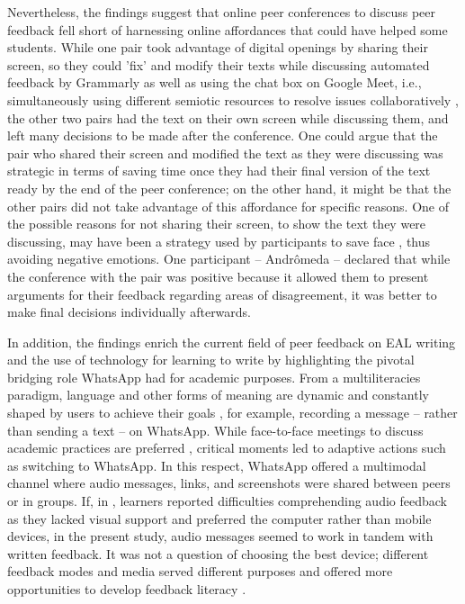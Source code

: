 \documentclass[english]{textolivre}
\begin{document}
Nevertheless, the findings suggest that online peer conferences to discuss peer feedback fell short of harnessing online affordances that could have helped some students. While one pair took advantage of digital openings by sharing their screen, so they could 'fix' and modify their texts while discussing automated feedback by Grammarly as well as using the chat box on Google Meet, i.e., simultaneously using different semiotic resources \cite{belda2021enhancing} to resolve issues collaboratively \cite{cheung2022verbal, cope2017learning}, the other two pairs had the text on their own screen while discussing them, and left many decisions to be made after the conference. One could argue that the pair who shared their screen and modified the text as they were discussing was strategic in terms of saving time once they had their final version of the text ready by the end of the peer conference; on the other hand, it might be that the other pairs did not take advantage of this affordance for specific reasons. One of the possible reasons for not sharing their screen, to show the text they were discussing, may have been a strategy used by participants to save face \cite{goffman1967interaction}, thus avoiding negative emotions. One participant – Andrômeda – declared that while the conference with the pair was positive because it allowed them to present arguments for their feedback regarding areas of disagreement, it was better to make final decisions individually afterwards.

In addition, the findings enrich the current field of peer feedback on EAL writing and the use of technology for learning to write by highlighting the pivotal bridging role WhatsApp had for academic purposes. From a multiliteracies paradigm, language and other forms of meaning are dynamic and constantly shaped by users to achieve their goals \cite{newlondon1996}, for example, recording a message – rather than sending a text – on WhatsApp. While face-to-face meetings to discuss academic practices are preferred \cite{bankier2022socialization}, critical moments led to adaptive actions such as switching to WhatsApp. In this respect, WhatsApp offered a multimodal channel where audio messages, links, and screenshots were shared between peers or in groups. If, in \textcite{bakla2020extensive}, learners reported difficulties comprehending audio feedback as they lacked visual support and preferred the computer rather than mobile devices, in the present study, audio messages seemed to work in tandem with written feedback. It was not a question of choosing the best device; different feedback modes and media served different purposes and offered more opportunities to develop feedback literacy \cite{carless2018development}.
\end{document}
